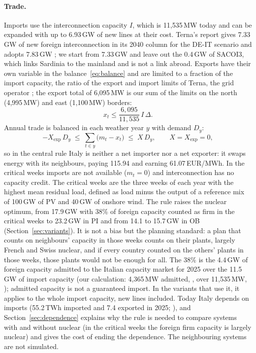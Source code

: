 \paragraph{Trade.} Imports use the interconnection capacity $I$, which is 11{,}535\,MW today \citep{ARERA366} and can be expanded with up to 6.93\,GW of new lines at their cost. Terna's report gives 7.33\,GW of new foreign interconnection in its 2040 column for the DE-IT scenario and adopts 7.83\,GW \citep{TernaCapObj2025}; we start from 7.33\,GW and leave out the 0.4\,GW of SACOI3, which links Sardinia to the mainland and is not a link abroad. Exports have their own variable in the balance~\eqref{eq:balance} and are limited to a fraction of the import capacity, the ratio of the export and import limits of Terna, the grid operator \citep{TernaCapObj2025}; the export total of 6{,}095\,MW is our sum of the limits on the north (4{,}995\,MW) and east (1{,}100\,MW) borders:
\begin{equation}
x_t\le \frac{6{,}095}{11{,}535}\,I\,\Delta .
\end{equation}
Annual trade is balanced in each weather year $y$ with demand $D_y$:
\begin{equation}
-X_{\mathrm{exp}}\,D_y\;\le\;\sum_{t\in y}\big(m_t-x_t\big)\;\le\;X\,D_y ,\qquad X=X_{\mathrm{exp}}=0 ,\label{eq:swap}
\end{equation}
so in the central rule Italy is neither a net importer nor a net exporter: it swaps energy with its neighbours, paying 115.94 and earning 61.07\,EUR/MWh. In the critical weeks imports are not available ($m_t=0$) and interconnection has no capacity credit. The critical weeks are the three weeks of each year with the highest mean residual load, defined as load minus the output of a reference mix of 100\,GW of PV and 40\,GW of onshore wind. The rule raises the nuclear optimum, from 17.9\,GW with 38\% of foreign capacity counted as firm in the critical weeks to 23.2\,GW in PI and from 14.1 to 15.7\,GW in OB (Section~\ref{sec:variants}). It is not a bias but the planning standard: a plan that counts on neighbours' capacity in those weeks counts on their plants, largely French and Swiss nuclear, and if every country counted on the others' plants in those weeks, those plants would not be enough for all. The 38\% is the 4.4\,GW of foreign capacity admitted to the Italian capacity market for 2025 over the 11.5\,GW of import capacity (our calculation: 4{,}365\,MW admitted, \citealp{TernaCM2025}, over 11{,}535\,MW, \citealp{ARERA366}); admitted capacity is not a guaranteed import. In the variants that use it, it applies to the whole import capacity, new lines included. Today Italy depends on imports (55.2\,TWh imported and 7.4 exported in 2025; \citealp{GME2025}), and Section~\ref{sec:dependence} explains why the rule is needed to compare systems with and without nuclear (in the critical weeks the foreign firm capacity is largely nuclear) and gives the cost of ending the dependence. The neighbouring systems are not simulated.

